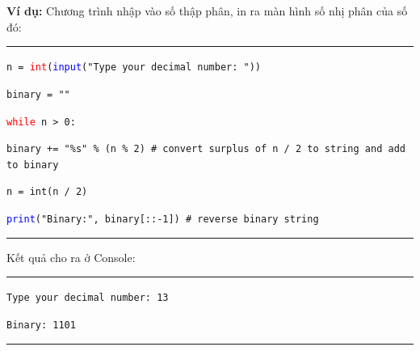 \newpage
\textbf{Ví dụ:} Chương trình nhập vào số thập phân, in ra màn hình số nhị phân của số đó:\\
\rule{\linewidth}{0.2mm}\par
\begin{linenumbers}
	\texttt{n = \textcolor{red}{int}(\textcolor{blue}{input}("Type your decimal number: "))}\par
	\texttt{binary = ""}\par
	\texttt{\textcolor{red}{while} n > 0:}\par
	\qquad \texttt{binary += "\%s" \% (n \% 2) \# convert surplus of n / 2 to string and add to binary	
	}\par
	\qquad \texttt{n = int(n / 2)}\par
	\texttt{\textcolor{blue}{print}("Binary:", binary[::-1]) \# reverse binary string}\par
\end{linenumbers}
\rule{\linewidth}{0.2mm}\par
\noindent
\resetlinenumber
Kết quả cho ra ở Console:\\
\rule{\linewidth}{0.2mm}\par
\begin{linenumbers}
	\texttt{Type your decimal number: 13}\par
	\texttt{Binary: 1101}\par
\end{linenumbers}
\rule{\linewidth}{0.2mm}\par
\resetlinenumber
\newpage